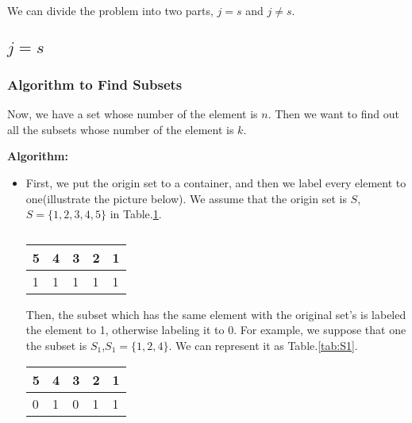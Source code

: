 
We can divide the problem into two parts, $j=s$ and $j \neq s$.
\subsection{$j=s$}
    
    \subsubsection{Algorithm to Find Subsets}
    Now, we have a set whose number of the element is $n$. Then we want to find out all the subsets whose 
    number of the element is $k$.

    \textbf{Algorithm: }
        \begin{itemize}
            \item First, we put the origin set to a container, and then we label every element to one(illustrate the picture below). 
            We assume that the origin set is $S$, $S=\{1,2,3,4,5\}$ in Table.\ref{tab:S}.
            \begin{table}[!hpbt]
                \centering
                \begin{tabular}{lllll}
                \hline
                \multicolumn{1}{|l|}{5} & \multicolumn{1}{l|}{4} & \multicolumn{1}{l|}{3} & \multicolumn{1}{l|}{2} & \multicolumn{1}{l|}{1} \\ \hline
                1                       & 1                      & 1                      & 1                      & 1                     
                \end{tabular}
                \caption{}
                \label{tab:S}
            \end{table}
            Then, the subset which has the same element with the original set's is labeled the element to 1, otherwise labeling it to 0. For 
            example, we suppose that one the subset is $S_1$,$S_1=\{1,2,4\}$. We can represent it as Table.\ref{tab:S1}.
            \begin{table}[!hpbt]
                \centering
                \begin{tabular}{lllll}
                \hline
                \multicolumn{1}{|l|}{5} & \multicolumn{1}{l|}{4} & \multicolumn{1}{l|}{3} & \multicolumn{1}{l|}{2} & \multicolumn{1}{l|}{1} \\ \hline
                0                       & 1                      & 0                      & 1                      & 1                     
                \end{tabular}

\end{table}
\end{itemize}
